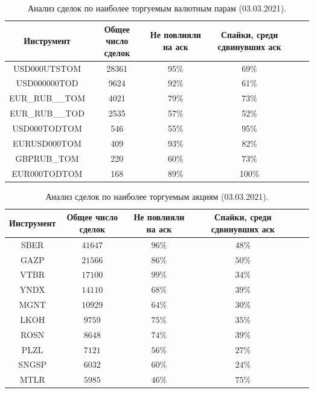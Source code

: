 \begin{table}[h!]
    \begin{center}
        \begin{tabular}{|c|c|c|c|c|c|}
            \hline
        Инструмент        & Общее число сделок & Не повлияли на аск & Спайки, среди сдвинувших аск \\ \hline
        USD000UTSTOM & 28361 &    95\% & 69\% \\ \hline
        USD000000TOD & 9624 &     92\% & 61\% \\ \hline
        EUR\_RUB\_\_TOM & 4021 &  79\% & 73\% \\ \hline
        EUR\_RUB\_\_TOD & 2535 &  57\% & 52\% \\ \hline
        USD000TODTOM & 546 &      55\% & 95\% \\ \hline
        EURUSD000TOM & 409 &      93\% & 82\% \\ \hline
        GBPRUB\_TOM & 220 &       60\% & 73\% \\ \hline
        EUR000TODTOM & 168 &      89\% & 100\%  \\ \hline
        \end{tabular}
    \end{center}
    \label{tableanalCU}
    \caption{Анализ сделок по наиболее торгуемым валютным парам (03.03.2021).}
\end{table} 

\begin{table}[h!]
    \begin{center}
        \begin{tabular}{|c|c|c|c|c|c|}
            \hline
        Инструмент   & Общее число сделок & Не повлияли на аск & Спайки, среди сдвинувших аск \\ \hline
        SBER &  $41647$  & $ 96\% $ &  $ 48\% $\\ \hline
        GAZP &  $21566$  & $ 86\% $  & $ 50\% $ \\ \hline
        VTBR &  $17100$  & $ 99\% $ &  $ 34\%$ \\ \hline
        YNDX &  $14110$  & $ 68\% $  & $ 39\% $ \\ \hline
        MGNT &  $10929$  & $ 64\% $  & $ 30\% $ \\ \hline
        LKOH &  $9759 $ &  $ 75\% $ &  $ 35\% $\\ \hline
        ROSN &  $8648 $ &  $ 74\% $ &  $ 39\%$ \\ \hline
        PLZL &  $7121 $ &  $ 56\% $ &  $ 27\% $\\ \hline
        SNGSP & $ 6032$  & $ 60\% $  & $ 24\% $ \\ \hline
        MTLR &  $5985 $ &  $ 46\% $ &  $ 75\%$\\ \hline
        \end{tabular}
    \end{center}
    \label{tableanalSE}
    \caption{Анализ сделок по наиболее торгуемым акциям (03.03.2021).}
\end{table} 

